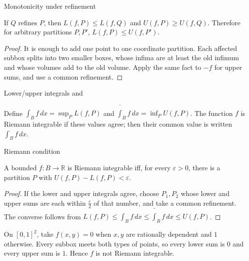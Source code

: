 \begin{lemma}{Monotonicity under refinement}

If \(Q\) refines \(P\), then \(L\left( {f,P} \right) \leq L\left( {f,Q} \right)\) and \(U\left( {f,P} \right) \geq U\left( {f,Q} \right)\). Therefore for arbitrary partitions \(P,P'\), \(L\left( {f,P} \right) \leq U\left( {f,P'} \right)\).

\end{lemma}

\begin{proof}

It is enough to add one point to one coordinate partition. Each affected subbox splits into two smaller boxes, whose infima are at least the old infimum and whose volumes add to the old volume. Apply the same fact to \(- f\) for upper sums, and use a common refinement.

\end{proof}

\begin{definition}{Lower/upper integrals and }

Define \(\int_{B}f\, dx = \sup_{P}L\left( {f,P} \right)\) and \({\bar{\int}}_{B}f\, dx = \inf_{P}U\left( {f,P} \right)\). The function \(f\) is Riemann integrable if these values agree; then their common value is written \(\int_{B}f\, dx\).

\end{definition}

\begin{theorem}{Riemann condition}

A bounded \(f:B\rightarrow\mathbb{R}\) is Riemann integrable iff, for every \(\varepsilon > 0\), there is a partition \(P\) with \(U\left( {f,P} \right) - L\left( {f,P} \right) < \varepsilon\).

\end{theorem}

\begin{proof}

If the lower and upper integrals agree, choose \(P_{1},P_{2}\) whose lower and upper sums are each within \(\frac{\varepsilon}{2}\) of that number, and take a common refinement. The converse follows from \(L\left( {f,P} \right) \leq \int_{B}f\, dx \leq {\bar{\int}}_{B}f\, dx \leq U\left( {f,P} \right)\).

\end{proof}

\begin{example}

On \(\left\lbrack {0,1} \right\rbrack^{2}\), take \(f\left( {x,y} \right) = 0\) when \(x,y\) are rationally dependent and \(1\) otherwise. Every subbox meets both types of points, so every lower sum is \(0\) and every upper sum is \(1\). Hence \(f\) is not Riemann integrable.

\end{example}


